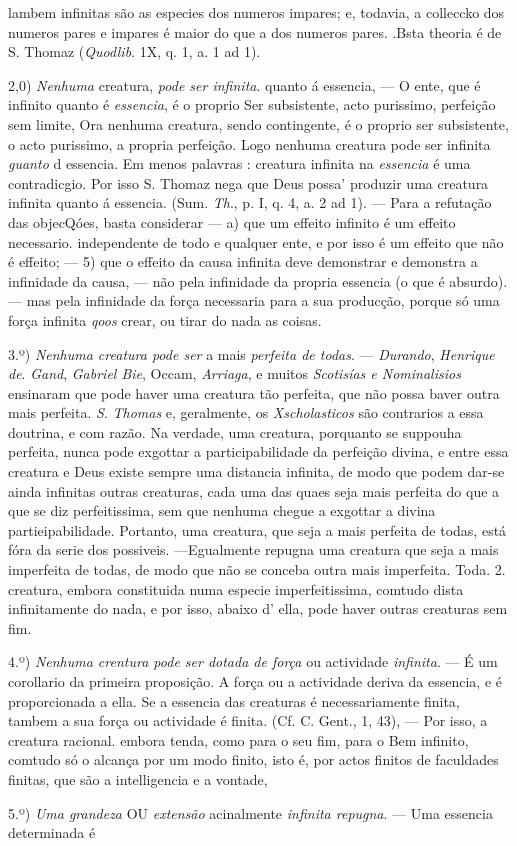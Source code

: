 lambem infinitas são as especies dos numeros impares; e, todavia, a colleccko dos numeros pares e impares é maior do que a dos numeros pares. .Bsta theoria é de S. Thomaz (\emph{Quodlib}. 1X, q. 1, a. 1 ad 1).\par 2,0) \emph{Nenhuma} creatura, \emph{pode ser infinita}. quanto á essencia, --- O ente, que é infinito quanto é \emph{essencia}, é o proprio Ser subsistente, acto purissimo, perfeição sem limite, Ora nenhuma creatura, sendo contingente, é o proprio ser subsistente, o acto purissimo, a propria perfeição. Logo nenhuma creatura pode ser infinita \emph{guanto} d essencia. Em menos palavras : creatura infinita na \emph{essencia} é uma contradicgio. Por isso S. Thomaz nega que Deus possa' produzir uma creatura infinita quanto á essencia. (Sum. \emph{Th}., p. I, q. 4, a. 2 ad 1). --- Para a refutação das objecQóes, basta considerar --- a) que um effeito infinito é um effeito necessario. independente de todo e qualquer ente, e por isso é um effeito que não é effeito; --- 5) que o effeito da causa infinita deve demonstrar e demonstra a infinidade da causa, --- não pela infinidade da propria essencia (o que é absurdo). --- mas pela infinidade da força necessaria para a sua producção, porque só uma força infinita \emph{qoos} crear, ou tirar do nada as coisas.\par 3.º) \emph{Nenhuma creatura pode ser} a mais \emph{perfeita de todas}. --- \emph{Durando}, \emph{Henrique de}. \emph{Gand}, \emph{Gabriel Bie}, Occam, \emph{Arriaga}, e muitos \emph{Scotisías e Nominalisios} ensinaram que pode haver uma creatura tão perfeita, que não possa baver outra mais perfeita. \emph{S}. \emph{Thomas} e, geralmente, os \emph{Xscholasticos} são contrarios a essa doutrina, e com razão. Na verdade, uma creatura, porquanto se suppouha perfeita, nunca pode exgottar a participabilidade da perfeição divina, e entre essa creatura e Deus existe sempre uma distancia infinita, de modo que podem dar-se ainda infinitas outras creaturas, cada uma das quaes seja mais perfeita do que a que se diz perfeitissima, sem que nenhuma chegue a exgottar a divina partieipabilidade. Portanto, uma creatura, que seja a mais perfeita de todas, está fóra da serie dos possiveis. ---Egualmente repugna uma creatura que seja a mais imperfeita de todas, de modo que não se conceba outra mais imperfeita. Toda. 2. creatura, embora constituida numa especie imperfeitissima, comtudo dista infinitamente do nada, e por isso, abaixo d' ella, pode haver outras creaturas sem fim.\par 4.º) \emph{Nenhuma crentura pode ser dotada de força} ou actividade \emph{infinita}. --- É um corollario da primeira proposição. A força ou a actividade deriva da essencia, e é proporcionada a ella. Se a essencia das creaturas é necessariamente finita, tambem a sua força ou actividade é finita. (Cf. C. Gent., 1, 43), --- Por isso, a creatura racional. embora tenda, como para o seu fim, para o Bem infinito, comtudo só o alcança por um modo finito, isto é, por actos finitos de faculdades finitas, que são a intelligencia e a vontade,\par 5.º) \emph{Uma grandeza} OU \emph{extensão} acinalmente \emph{infinita repugna}. --- Uma essencia determinada é 